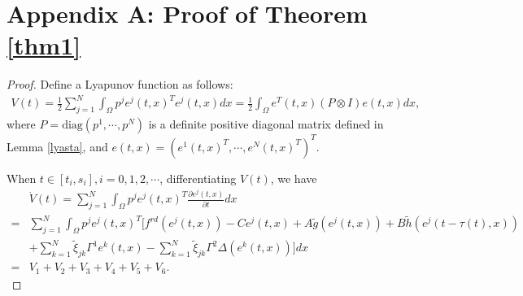 \documentclass[review]{elsarticle}
\begin{document}
\section*{Appendix A: Proof of Theorem \ref{thm1}}\label{appA}
\begin{proof}
Define a Lyapunov function as follows:
\begin{align}\label{lyap_1}
V(t)=\frac{1}{2}\sum\limits_{j=1}^N\int_{\Omega}p^je^j(t,x)^Te^j(t,x)dx=\frac{1}{2}\int_{\Omega}e^T(t,x)(P\otimes I)e(t,x)dx,
\end{align}
where $P=\mathrm{diag}(p^1,\cdots,p^N)$ is a definite positive diagonal matrix defined in Lemma \ref{lyasta}, and $e(t,x)=(e^1(t,x)^T,\cdots,e^N(t,x)^T)^T$.

When $t\in [t_i, s_i], i=0,1,2,\cdots$, differentiating $V(t)$, we have
\begin{align}\label{v0}
&\dot{V}(t)=\sum\limits_{j=1}^N\int_{\Omega}p^je^j(t,x)^T\frac{\partial{e}^j(t,x)}{\partial{t}}dx\nonumber\\
=&\sum\limits_{j=1}^N\int_{\Omega}p^je^j(t,x)^T\bigg[f^{rd}(e^j(t,x))-Ce^j(t,x)+A\tilde{g}(e^j(t,x))+B\tilde{h}(e^j(t-\tau(t),x))\nonumber\\
&+\sum\limits_{k=1}^N\tilde{\xi}_{jk}\Gamma^1
e^k(t,x)-\sum\limits_{k=1}^N\tilde{\xi}_{jk}\Gamma^2
\Delta(e^k(t,x))\bigg]dx\nonumber\\
=&V_1+V_2+V_3+V_4+V_5+V_6.
\end{align}


\end{proof}
\end{document}
